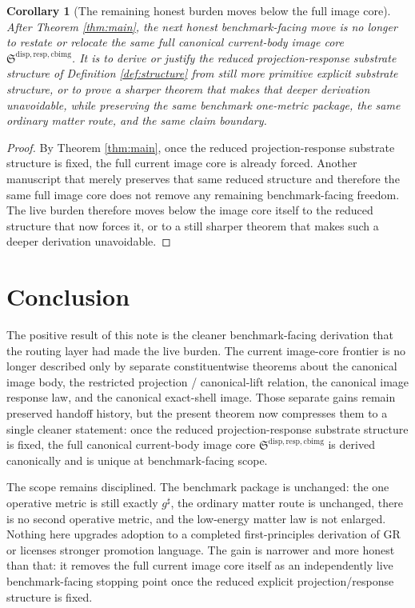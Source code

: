 \documentclass[11pt]{article}
\newcommand{\CompletedMetric}{g^{\sharp}}
\newcommand{\CurrentBodyImageCore}{\mathfrak S^{\mathrm{disp,resp,cbimg}}}
\newtheorem{corollary}{Corollary}
\begin{document}
\begin{corollary}[The remaining honest burden moves below the full image core]
\label{cor:burden}
After Theorem \ref{thm:main}, the next honest benchmark-facing move is no longer to restate or relocate the same full canonical current-body image core \(\CurrentBodyImageCore\). It is to derive or justify the reduced projection-response substrate structure of Definition \ref{def:structure} from still more primitive explicit substrate structure, or to prove a sharper theorem that makes that deeper derivation unavoidable, while preserving the same benchmark one-metric package, the same ordinary matter route, and the same claim boundary.
\end{corollary}

\begin{proof}
By Theorem \ref{thm:main}, once the reduced projection-response substrate structure is fixed, the full current image core is already forced. Another manuscript that merely preserves that same reduced structure and therefore the same full image core does not remove any remaining benchmark-facing freedom. The live burden therefore moves below the image core itself to the reduced structure that now forces it, or to a still sharper theorem that makes such a deeper derivation unavoidable.
\end{proof}

\section{Conclusion}

The positive result of this note is the cleaner benchmark-facing derivation that the routing layer had made the live burden. The current image-core frontier is no longer described only by separate constituentwise theorems about the canonical image body, the restricted projection / canonical-lift relation, the canonical image response law, and the canonical exact-shell image. Those separate gains remain preserved handoff history, but the present theorem now compresses them to a single cleaner statement: once the reduced projection-response substrate structure is fixed, the full canonical current-body image core \(\CurrentBodyImageCore\) is derived canonically and is unique at benchmark-facing scope.

The scope remains disciplined. The benchmark package is unchanged: the one operative metric is still exactly \(\CompletedMetric\), the ordinary matter route is unchanged, there is no second operative metric, and the low-energy matter law is not enlarged. Nothing here upgrades adoption to a completed first-principles derivation of GR or licenses stronger promotion language. The gain is narrower and more honest than that: it removes the full current image core itself as an independently live benchmark-facing stopping point once the reduced explicit projection/response structure is fixed.
\end{document}
